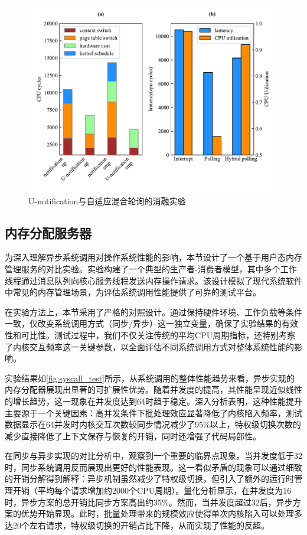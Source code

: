 \begin{figure}[htbp]
    \centering
    \includegraphics[width=1.0\textwidth]{figures/ntfn_test.pdf}
    \caption{U-notification与自适应混合轮询的消融实验}\label{fig:ntfn_test}
\end{figure}

\subsection{内存分配服务器}
为深入理解异步系统调用对操作系统性能的影响，本节设计了一个基于用户态内存管理服务的对比实验。实验构建了一个典型的生产者-消费者模型，其中多个工作线程通过消息队列向核心服务线程发送内存操作请求。该设计模拟了现代系统软件中常见的内存管理场景，为评估系统调用性能提供了可靠的测试平台。

在实验方法上，本节采用了严格的对照设计。通过保持硬件环境、工作负载等条件一致，仅改变系统调用方式（同步/异步）这一独立变量，确保了实验结果的有效性和可比性。测试过程中，我们不仅关注传统的平均CPU周期指标，还特别考察了内核交互频率这一关键参数，以全面评估不同系统调用方式对整体系统性能的影响。

实验结果如\ref{fig:syscall_test}所示，从系统调用的整体性能趋势来看，异步实现的内存分配器展现出显著的可扩展性优势。随着并发度的提高，其性能呈现近似线性的增长趋势，这一现象在并发度达到64时趋于稳定。深入分析表明，这种性能提升主要源于一个关键因素：高并发条件下批处理效应显著降低了内核陷入频率，测试数据显示在64并发时内核交互次数较同步情况减少了95\%以上，特权级切换次数的减少直接降低了上下文保存与恢复的开销，同时还增强了代码局部性。

在同步与异步实现的对比分析中，观察到一个重要的临界点现象。当并发度低于32时，同步系统调用反而展现出更好的性能表现。这一看似矛盾的现象可以通过细致的开销分解得到解释：异步机制虽然减少了特权级切换，但引入了额外的运行时管理开销（平均每个请求增加约2000个CPU周期）。量化分析显示，在并发度为16时，异步方案的总开销比同步方案高出约35\%。然而，当并发度超过32后，异步方案的优势开始显现。此时，批量处理带来的规模效应使得单次内核陷入可以处理多达20个左右请求，特权级切换的开销占比下降，从而实现了性能的反超。

